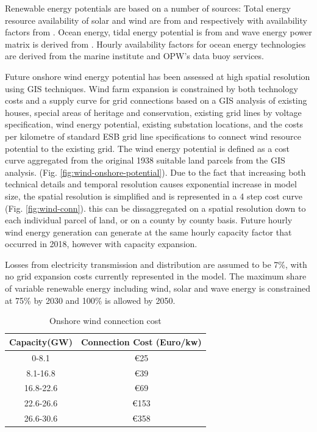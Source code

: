 \documentclass[journal abbreviation, manuscript]{copernicus}
\begin{document}
Renewable energy potentials are based on a number of sources: Total energy resource availability of solar and wind are from \cite{Pfenninger2016} and \cite{Staffell2016} respectively with availability factors from \cite{Ruiz2019}. Ocean energy, tidal energy potential is from \cite{ORourke2010} and wave energy power matrix is derived from \cite{Nambiar2016}. Hourly availability factors for ocean energy technologies are derived from the marine institute and OPW's data buoy services.

Future onshore wind energy potential has been assessed at high spatial resolution using GIS techniques. Wind farm expansion is constrained by both technology costs and a supply curve for grid connections based on a GIS analysis of existing houses, special areas of heritage and conservation, existing grid lines by voltage specification, wind energy potential, existing substation locations, and the costs per kilometre of standard ESB grid line specifications to connect wind resource potential to the existing grid. The wind energy potential is defined as a cost curve aggregated from the original 1938 suitable land parcels from the GIS analysis. (Fig. \ref{fig:wind-onshore-potential}). Due to the fact that increasing both technical details and temporal resolution causes exponential increase in model size, the spatial resolution is simplified and is represented in a 4 step cost curve (Fig. \ref{fig:wind-conn}). this can be dissaggregated on a spatial resolution down to each individual parcel of land, or on a county by county basis. Future hourly wind energy generation can generate at the same hourly capacity factor that occurred in 2018, however with capacity expansion.

Losses from electricity transmission and distribution are assumed to be 7\%, with no grid expansion costs currently represented in the model. The maximum share of variable renewable energy including wind, solar and wave energy is constrained at 75\% by 2030 and 100\% is allowed by 2050. 

\begin{table}[h]
 \centering
 \footnotesize
 \caption{Onshore wind connection cost }
 \begin{tabular}{cc}
 \hline 
 Capacity(GW) & Connection Cost (Euro/kw)\\ 
 \hline
 0-8.1 & €25 \\
 
 8.1-16.8 & €39 \\
 
 16.8-22.6 & €69 \\
 
 22.6-26.6 & €153 \\
 
 26.6-30.6 & €358 \\
 
 \hline
 \end{tabular}
 
 \label{onshore-wind-connection-cost}
\end{table}
\end{document}
